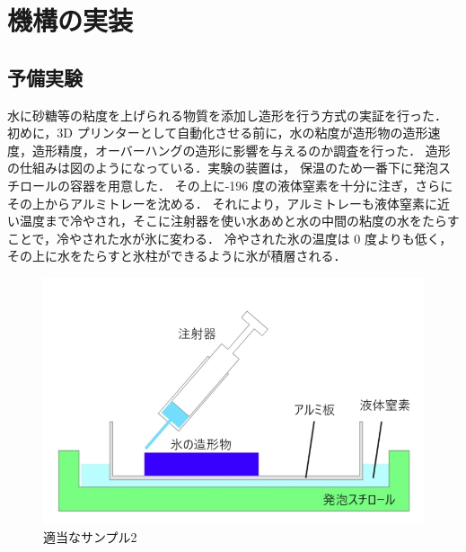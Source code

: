 \chapter{機構の実装}
\label{chp:first}

\section{予備実験}
\label{sec:paragraph}

水に砂糖等の粘度を上げられる物質を添加し造形を行う方式の実証を行った．
初めに，3D プリンターとして自動化させる前に，水の粘度が造形物の造形速度，造形精度，オーバーハングの造形に影響を与えるのか調査を行った． 
造形の仕組みは図のようになっている．実験の装置は， 保温のため一番下に発泡スチロールの容器を用意した．
その上に-196 度の液体窒素を十分に注ぎ，さらにその上からアルミトレーを沈める．
それにより，アルミトレーも液体窒素に近い温度まで冷やされ，そこに注射器を使い水あめと水の中間の粘度の水をたらすことで，冷やされた水が氷に変わる．
冷やされた氷の温度は 0 度よりも低く，その上に水をたらすと氷柱ができるように氷が積層される． 

\begin{figure}[H]
  \centering
  \includegraphics[width=6.4truecm]{./fig/yobi5.jpg}
  \caption{適当なサンプル2}
  \label{fig:ゲル}
\end{figure}


